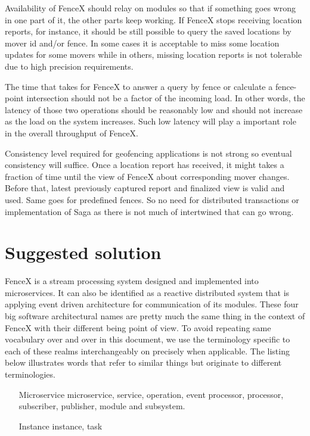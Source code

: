 \documentclass[a4]{report}
\begin{document}
    Availability of FenceX should relay on modules so that if something goes wrong in one part of it, the other parts keep working. If FenceX stops receiving location reports, for instance, it should be still possible to query the saved locations by mover id and/or fence. In some cases it is acceptable to miss some location updates for some movers while in others, missing location reports is not tolerable due to high precision requirements.

    The time that takes for FenceX to answer a query by fence or calculate a fence-point intersection should not be a factor of the incoming load. In other words, the latency of those two operations should be reasonably low and should not increase as the load on the system increases. Such low latency will play a important role in the overall throughput of FenceX.


    Consistency level required for geofencing applications is not strong so eventual consistency will suffice. Once a location report has received, it might takes a fraction of time until the view of FenceX about corresponding mover changes. Before that, latest previously captured report and finalized view is valid and used. Same goes for predefined fences. So no need for distributed transactions or implementation of Saga as there is not much of intertwined that can go wrong.


    \chapter{Suggested solution}
    FenceX is a stream processing system designed and implemented into microservices. It can also be identified as a reactive distributed system that is applying event driven architecture for communication of its modules. These four big software architectural names are pretty much the same thing in the context of FenceX with their different being point of view. To avoid repeating same vocabulary over and over in this document, we use the terminology specific to each of these realms interchangeably on precisely when applicable. The listing below  illustrates words that refer to similar things but originate to different terminologies.

    \begin{itemize}
        \item[Microservice] microservice, service, operation, event processor,  processor, subscriber, publisher, module and subsystem.
        \item[Instance] instance, task
    \end{itemize}
\end{document}
